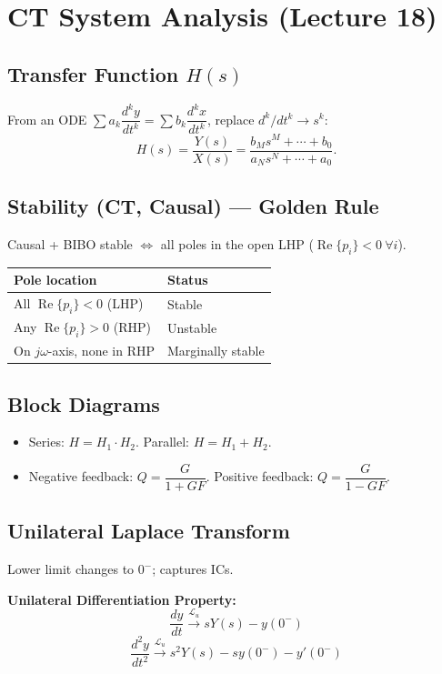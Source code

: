 \documentclass[11pt]{article}
\begin{document}
\section{CT System Analysis (Lecture 18)}

\subsection{Transfer Function $H(s)$}
From an ODE $\sum a_k \dfrac{d^k y}{dt^k} = \sum b_k \dfrac{d^k x}{dt^k}$, replace $d^k/dt^k \to s^k$:
\[ H(s) = \frac{Y(s)}{X(s)} = \frac{b_M s^M + \cdots + b_0}{a_N s^N + \cdots + a_0}. \]

\subsection{Stability (CT, Causal) --- Golden Rule}
Causal + BIBO stable $\iff$ all poles in the open LHP ($\operatorname{Re}\{p_i\} < 0 \ \forall i$).

\begin{center}
\begin{tabular}{ll}
\toprule
Pole location & Status \\
\midrule
All $\operatorname{Re}\{p_i\} < 0$ (LHP) & Stable \\
Any $\operatorname{Re}\{p_i\} > 0$ (RHP) & Unstable \\
On $j\omega$-axis, none in RHP & Marginally stable \\
\bottomrule
\end{tabular}
\end{center}

\subsection{Block Diagrams}
\begin{itemize}
  \item Series: $H = H_1 \cdot H_2$. Parallel: $H = H_1 + H_2$.
  \item Negative feedback: $Q = \dfrac{G}{1 + GF}$. Positive feedback: $Q = \dfrac{G}{1 - GF}$.
\end{itemize}

\subsection{Unilateral Laplace Transform}
Lower limit changes to $0^-$; captures ICs.

\textbf{Unilateral Differentiation Property:}
\[ \frac{dy}{dt} \xrightarrow{\mathcal{L}_u} sY(s) - y(0^-) \]
\[ \frac{d^2 y}{dt^2} \xrightarrow{\mathcal{L}_u} s^2 Y(s) - s y(0^-) - y'(0^-) \]
\end{document}
